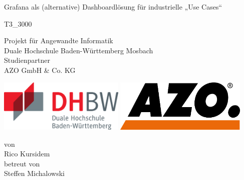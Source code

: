 \def\doctype{T3\_3000}
\def\title{Grafana als (alternative) Dashboardlösung für industrielle „Use Cases“}
\def\author{Rico Kursidem}
\def\supervisor{Steffen Michalowski}

\begin{titlepage}

\vspace{10mm}

\begin{center}
	
	\vspace{5mm}
	\huge \title
	
	\vspace{34pt}
	\large \doctype
		
	\vspace{30pt}	
	\small Projekt für Angewandte Informatik \\
	\large Duale Hochschule Baden-Württemberg Mosbach \\
	\small Studienpartner \\
	\large AZO GmbH \& Co. KG \\
    \vspace{35pt}
    
    \includegraphics[height=2.5cm]{prefix/image/logo-dhbw.eps}
    \includegraphics[height=2.5cm]{prefix/image/logo-azo.png}
	
	\vspace{40pt}	
	\small von \\
	\large \author \\
	\small betreut von \\
	\large \supervisor
\end{center}

\vspace{75pt}


\vspace{49.7pt}


\end{titlepage}